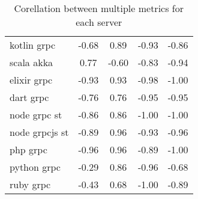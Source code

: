 \begin{table*}[!htb]
{\begin{tabular}{|l|c|c|c|c|}
            kotlin grpc    & -0.68       & 0.89                       & -0.93              & -0.86                   \\
            scala akka     & 0.77        & -0.60                      & -0.83              & -0.94                   \\
            elixir grpc    & -0.93       & 0.93                       & -0.98              & -1.00                   \\
            dart grpc      & -0.76       & 0.76                       & -0.95              & -0.95                   \\
            node grpc st   & -0.86       & 0.86                       & -1.00              & -1.00                   \\
            node grpcjs st & -0.89       & 0.96                       & -0.93              & -0.96                   \\
            php grpc       & -0.96       & 0.96                       & -0.89              & -1.00                   \\
            python grpc    & -0.29       & 0.86                       & -0.96              & -0.68                   \\
            ruby grpc      & -0.43       & 0.68                       & -1.00              & -0.89                   \\
            \bottomrule
        \end{tabular}
    }
    \caption{Corellation between multiple metrics for each server }
    \label{table:correlation}
\end{table*}